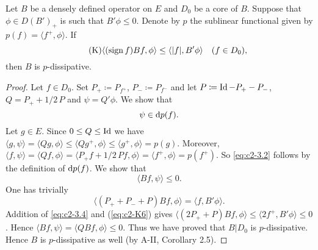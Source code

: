 \begin{proposition}\label{prop:c2-3.10}
Let $B$ be a densely defined operator on $E$ and $D_{0}$ be a core of $B$.
Suppose that $\phi \in D(B')_{+}$ is such that $B'\phi \leq 0$.
Denote by $p$ the sublinear functional given by $p(f) = \langle f^{+},\phi \rangle$. 
If
\begin{equation*}\label{eq:c2-K6} \tag{K}
\langle(\operatorname{sign} f) Bf,\phi \rangle \leq \langle|f|,B'\phi\rangle \quad (f \in D_{0}),
\end{equation*}
then $B$ is $p$-dissipative.
\end{proposition}

\begin{proof}
Let $f \in D_{0}$. 
Set $P_{+} \coloneqq P_{f^{+}}$, $P_{-} \coloneqq P_{f^{-}}$ and let
$P \coloneqq \operatorname{Id} - P_{+} - P_{-}$, $Q = P_{+} + 1/2 \, P$ and $\psi = Q'\phi$. We show that
\begin{equation}\label{eq:c2-3.2}
\psi \in \mathop{}\!\mathrm{d}{p}(f).
\end{equation}
Let $g \in E$. 
Since $0 \leq Q \leq \operatorname{Id}$ we have $\langle g,\psi \rangle = \langle Qg,\phi \rangle \leq \langle Qg^{+},\phi \rangle \leq
\langle g^{+},\phi \rangle = p(g)$. 
Moreover, $\langle f, \psi \rangle = \langle Qf,\phi \rangle = \langle P_{+}f + 1/2 \, Pf,\phi \rangle = \langle f^{+},\phi \rangle = p(f^{+})$. 
So \eqref{eq:c2-3.2} follows by the definition of $\mathop{}\!\mathrm{d}{p}(f)$. 
We show that
\begin{equation}\label{eq:c2-3.3}
\langle Bf,\psi \rangle \leq 0.
\end{equation}
One has trivially
\begin{equation}\label{eq:c2-3.4}
\langle(P_{+} + P_{-} + P) Bf,\phi \rangle = \langle f,B'\phi \rangle.
\end{equation}
Addition of \eqref{eq:c2-3.4} and (\ref{eq:c2-K6})   gives
$\langle(2P_{+} + P)Bf,\phi \rangle \leq \langle 2f^{+},B'\phi \rangle \leq 0$.
Hence $\langle Bf,\psi \rangle = \langle QBf,\phi \rangle \leq 0$.
Thus we have proved that $B|D_{0}$ is $p$-dissipative. 
Hence $B$ is $p$-dissipative as well (by A-II, Corollary 2.5).
\end{proof}

